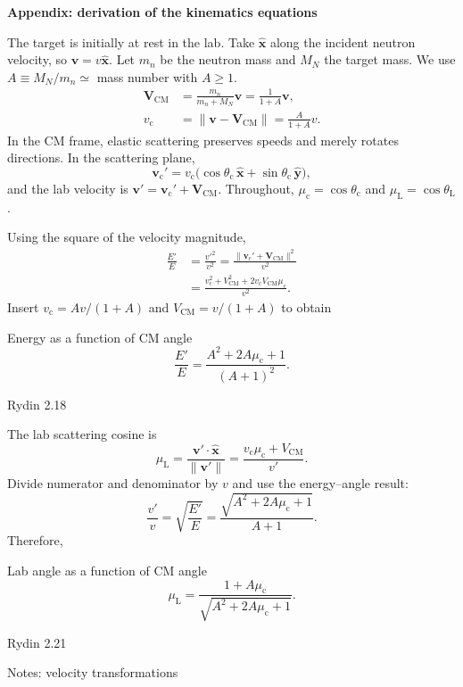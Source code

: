 \documentclass[board]{ne630handout}
\providecommand{\muc}{\mu_{\mathrm c}}
\providecommand{\mul}{\mu_{\mathrm L}}
\providecommand{\thetac}{\theta_{\mathrm c}}
\providecommand{\thetaL}{\theta_{\mathrm L}}
\providecommand{\vc}{v_{\mathrm c}}
\providecommand{\bvc}{\mathbf{v}_{\mathrm c}}
\providecommand{\bVCM}{\mathbf{V}_{\mathrm{CM}}}
\providecommand{\VCM}{V_{\mathrm{CM}}}
\providecommand{\SourceEq}[1]{\par\nobreak\hfill{\sffamily\scriptsize\color{KSUGray}#1}\par}
\begin{document}
{\sffamily\bfseries\large\color{KSUDeepPurple}
  Appendix: derivation of the kinematics equations\par}
\vspace{4pt}

\begin{handoutcolumns}
The target is initially at rest in the lab. Take $\hat{\mathbf x}$ along
the incident neutron velocity, so $\mathbf v=v\hat{\mathbf x}$.
Let $m_n$ be the neutron mass and $M_N$ the target mass. We use
$A\equiv M_N/m_n\simeq$ mass number with $A\geq1$.
\begin{align*}
 \bVCM&=\frac{m_n}{m_n+M_N}\mathbf v
       =\frac{1}{1+A}\mathbf v,\\
 \vc&=\|\mathbf v-\bVCM\|=\frac{A}{1+A}v.
\end{align*}
In the CM frame, elastic scattering preserves speeds and merely rotates
directions. In the scattering plane,
\[
\bvc'=\vc\big(\cos\thetac\,\hat{\mathbf x}
                  +\sin\thetac\,\hat{\mathbf y}\big),
\]
and the lab velocity is $\mathbf v'=\bvc'+\bVCM$.
Throughout, $\muc=\cos\thetac$ and $\mul=\cos\thetaL$.

Using the square of the velocity magnitude,
\begin{align*}
 \frac{E'}{E}
  &=\frac{v'^2}{v^2}
   =\frac{\|\bvc'+\bVCM\|^2}{v^2}\\
  &=\frac{\vc^2+\VCM^2+2\vc\VCM\muc}{v^2}.
\end{align*}
Insert $\vc=Av/(1+A)$ and $\VCM=v/(1+A)$ to obtain
\begin{fixedbox}{Energy as a function of CM angle}
\[
\frac{E'}{E}=\frac{A^2+2A\muc+1}{(A+1)^2}.
\]
\SourceEq{Rydin 2.18}
\end{fixedbox}

The lab scattering cosine is
\[
\mul=\frac{\mathbf v'\!\cdot\!\hat{\mathbf x}}{\|\mathbf v'\|}
  =\frac{\vc\muc+\VCM}{v'}.
\]
Divide numerator and denominator by $v$ and use the energy--angle result:
\[
\frac{v'}{v}=\sqrt{\frac{E'}{E}}
 =\frac{\sqrt{A^2+2A\muc+1}}{A+1}.
\]
Therefore,
\begin{fixedbox}{Lab angle as a function of CM angle}
\[
\mul=\frac{1+A\muc}{\sqrt{A^2+2A\muc+1}}.
\]
\SourceEq{Rydin 2.21}
\end{fixedbox}

\begin{boardbox}{Notes: velocity transformations}
\end{boardbox}


\end{handoutcolumns}
\end{document}
